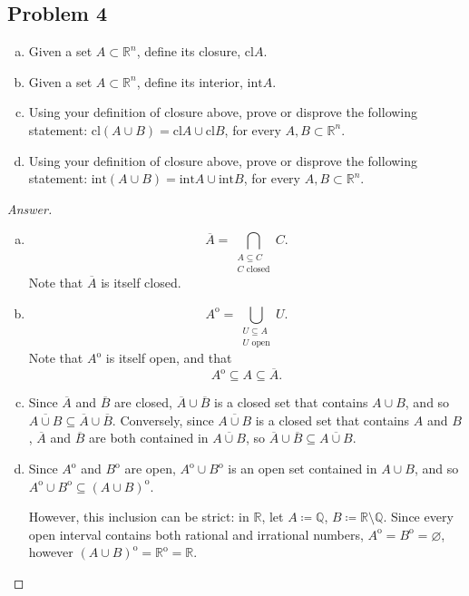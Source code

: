 \documentclass[12pt]{article}
\newcommand{\q}{\mathbb{Q}}
\newcommand{\real}{\mathbb{R}}
\newcommand\paren[1]{\left( #1 \right)}
\theoremstyle{definition}
\newcommand\interior[1]{#1^{\mathrm{o}}}
\begin{document}
\subsection{Problem 4}
\begin{enumerate}[(a)]
    \item Given a set $A \subset \real^n$, define its closure, $\mathrm{cl} A$.
    \item Given a set $A \subset \real^n$, define its interior, $\mathrm{int} A$.
    \item Using your definition of closure above, prove or disprove the following statement: $\mathrm{cl}(A \cup B) = \mathrm{cl}A \cup \mathrm{cl}B$, for every $A , B \subset \real^n$.
    \item Using your definition of closure above, prove or disprove the following statement: $\mathrm{int}(A \cup B) = \mathrm{int}A \cup \mathrm{int}B$, for every $A , B \subset \real^n$.
\end{enumerate}
\begin{proof}[Answer] 
    \noindent
    \begin{enumerate}[(a)]
        \item 
        \[
            \overline{A} = \bigcap\limits_{ \substack{
                A \subseteq C \\
                C \text{ closed}
            } } C.
        \]
        Note that $\overline{A}$ is itself closed.
        \item 
        \[
            A^{\mathrm{o}} = \bigcup\limits_{ \substack{
                U \subseteq A \\
                U \text{ open}
            } } U.
        \]
        Note that $\interior{A}$ is itself open, and that 
        \[
            \interior{A} \subseteq A \subseteq \overline{A}.
        \]
        \item Since $\overline{A}$ and $\overline{B}$ are closed, $\overline{A} \cup \overline{B}$ is a closed set that contains $A \cup B$, and so $\overline{A \cup B} \subseteq \overline{A} \cup \overline{B}$. Conversely, since $\overline{A \cup B}$ is a closed set that contains $A$ and $B$, $\overline{A}$ and $\overline{B}$ are both contained in $\overline{A \cup B}$, so $\overline{A} \cup \overline{B} \subseteq \overline{A \cup B}$.
        \item Since $\interior{A}$ and $\interior{B}$ are open, $\interior{A} \cup \interior{B}$ is an open set contained in $A \cup B$, and so $\interior{A} \cup \interior{B} \subseteq \interior{ \paren{ A \cup B } }$. 
        
        However, this inclusion can be strict: in $\real$, let $A \coloneqq \q$, $B \coloneqq \real \setminus \q$. Since every open interval contains both rational and irrational numbers, $\interior{A} = \interior{B} = \varnothing$, however $\interior{ \paren{ A \cup B } } = \interior{\real} = \real$.
    \end{enumerate}
\end{proof}
\newpage
\end{document}
